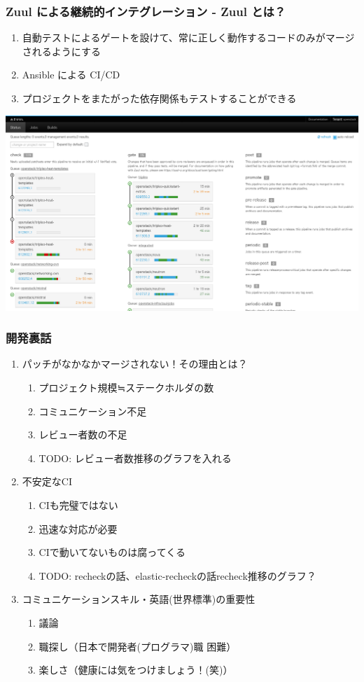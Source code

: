 \documentclass[aspectratio=169,11pt,hyperref={colorlinks=true}]{beamer}
\begin{document}
\begin{frame}
  \frametitle{Zuul による継続的インテグレーション - Zuul とは？}
  \begin{enumerate}
    \item 自動テストによるゲートを設けて、常に正しく動作するコードのみがマージされるようにする
    \item Ansible による CI/CD
    \item プロジェクトをまたがった依存関係もテストすることができる
  \end{enumerate}
  \centering\includegraphics[scale=0.2]{zuul-status.png}
\end{frame}

\begin{frame}
  \frametitle{開発裏話}
  \begin{enumerate}
    \item パッチがなかなかマージされない！その理由とは？
      \begin{enumerate}
        \item プロジェクト規模≒ステークホルダの数
        \item コミュニケーション不足
        \item レビュー者数の不足
        \item TODO: レビュー者数推移のグラフを入れる
      \end{enumerate}
    \item 不安定なCI
      \begin{enumerate}
        \item CIも完璧ではない
        \item 迅速な対応が必要
        \item CIで動いてないものは腐ってくる
        \item TODO: recheckの話、elastic-recheckの話recheck推移のグラフ？
      \end{enumerate}
    \item コミュニケーションスキル・英語(世界標準)の重要性
      \begin{enumerate}
        \item 議論
        \item 職探し（日本で開発者(プログラマ)職 困難）
        \item 楽しさ（健康には気をつけましょう！(笑)）
      \end{enumerate}
  \end{enumerate}
\end{frame}
\end{document}
